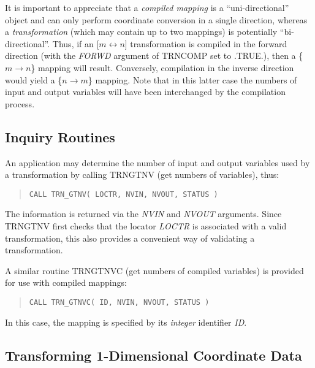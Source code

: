 \documentclass[twoside,11pt]{article}
\newcommand{\xlabel}[1]{}
\renewcommand{\_}{\texttt{\symbol{95}}}
\newcommand{\name}[1]{\mbox{\small{#1}}}
\newcommand{\fortvar}[1]{\mbox{\emph{#1}}}
\begin{document}
It is important to appreciate that a \emph{compiled mapping} is a
``uni-directional'' object and can only perform coordinate conversion in a
single direction, whereas a \emph{transformation} (which may contain up to
two mappings) is potentially ``bi-directional''.
Thus, if an [$m \leftrightarrow n$] transformation is compiled in the
forward direction (with the \fortvar{FORWD} argument of \name{TRN\_COMP} set
to \name{.TRUE.}), then a \mbox{\{$m \rightarrow n$\}} mapping will result.
Conversely, compilation in the inverse direction would yield a \mbox{\{$n
\rightarrow m$\}} mapping.
Note that in this latter case the numbers of input and output variables will
have been interchanged by the compilation process.


\subsection{\xlabel{inquiry_routines}Inquiry Routines}

An application may determine the number of input and output variables
used by a transformation by calling \name{TRN\_GTNV} (get numbers of
variables), thus:

\begin{quote}
\begin{verbatim}
CALL TRN_GTNV( LOCTR, NVIN, NVOUT, STATUS )
\end{verbatim}
\end{quote}

The information is returned via the \fortvar{NVIN} and \fortvar{NVOUT}
arguments.
Since \name{TRN\_GTNV} first checks that the locator \fortvar{LOCTR} is
associated with a valid transformation, this also provides a convenient way
of validating a transformation.

A similar routine \name{TRN\_GTNVC} (get numbers of compiled variables) is
provided for use with compiled mappings:

\begin{quote}
\begin{verbatim}
CALL TRN_GTNVC( ID, NVIN, NVOUT, STATUS )
\end{verbatim}
\end{quote}

In this case, the mapping is specified by its \emph{integer} identifier
\fortvar{ID}.


\subsection{\xlabel{transforming_1dimensional_coordinate_data}Transforming 1-Dimensional Coordinate Data}
\end{document}
